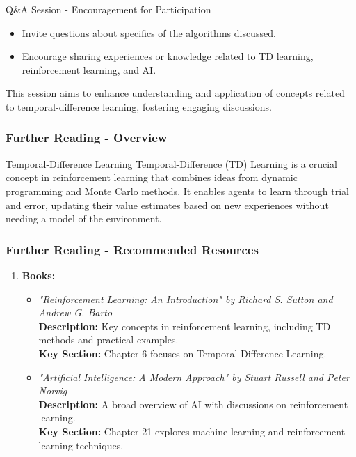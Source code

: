 \documentclass[aspectratio=169]{beamer}
\begin{document}
\begin{frame}[fragile]{Q\&A Session - Encouragement for Participation}
    \begin{itemize}
        \item Invite questions about specifics of the algorithms discussed.
        \item Encourage sharing experiences or knowledge related to TD learning, reinforcement learning, and AI.
    \end{itemize}

    This session aims to enhance understanding and application of concepts related to temporal-difference learning, fostering engaging discussions.
\end{frame}

\begin{frame}[fragile]
    \frametitle{Further Reading - Overview}
    \begin{block}{Temporal-Difference Learning}
        Temporal-Difference (TD) Learning is a crucial concept in reinforcement learning that combines ideas from dynamic programming and Monte Carlo methods. 
        It enables agents to learn through trial and error, updating their value estimates based on new experiences without needing a model of the environment.
    \end{block}
\end{frame}

\begin{frame}[fragile]
    \frametitle{Further Reading - Recommended Resources}
    \begin{enumerate}
        \item \textbf{Books:}
        \begin{itemize}
            \item \textit{"Reinforcement Learning: An Introduction" by Richard S. Sutton and Andrew G. Barto}\\
            \textbf{Description:} Key concepts in reinforcement learning, including TD methods and practical examples.\\
            \textbf{Key Section:} Chapter 6 focuses on Temporal-Difference Learning.
            
            \item \textit{"Artificial Intelligence: A Modern Approach" by Stuart Russell and Peter Norvig}\\
            \textbf{Description:} A broad overview of AI with discussions on reinforcement learning.\\
            \textbf{Key Section:} Chapter 21 explores machine learning and reinforcement learning techniques.
        \end{itemize}
    \end{enumerate}
\end{frame}
\end{document}
